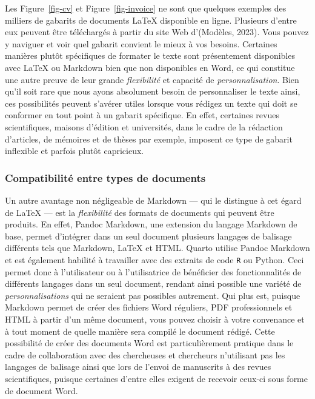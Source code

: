 \documentclass[
  letterpaper,
  DIV=11,
  numbers=noendperiod]{scrreprt}
\begin{document}
Les Figure~\ref{fig-cv} et Figure~\ref{fig-invoice} ne sont que quelques
exemples des milliers de gabarits de documents LaTeX disponible en
ligne. Plusieurs d'entre eux peuvent être téléchargés à partir du site
Web d'(Modèles, 2023). Vous pouvez y naviguer et voir quel gabarit
convient le mieux à vos besoins. Certaines manières plutôt spécifiques
de formater le texte sont présentement disponibles avec LaTeX ou
Markdown bien que non disponibles en Word, ce qui constitue une autre
preuve de leur grande \emph{flexibilité} et capacité de
\emph{personnalisation}. Bien qu'il soit rare que nous ayons absolument
besoin de personnaliser le texte ainsi, ces possibilités peuvent
s'avérer utiles lorsque vous rédigez un texte qui doit se conformer en
tout point à un gabarit spécifique. En effet, certaines revues
scientifiques, maisons d'édition et universités, dans le cadre de la
rédaction d'articles, de mémoires et de thèses par exemple, imposent ce
type de gabarit inflexible et parfois plutôt capricieux.

\subsubsection{Compatibilité entre types de
documents}\label{compatibilituxe9-entre-types-de-documents}

Un autre avantage non négligeable de Markdown --- qui le distingue à cet
égard de LaTeX --- est la \emph{flexibilité} des formats de documents
qui peuvent être produits. En effet, Pandoc Markdown, une extension du
langage Markdown de base, permet d'intégrer dans un seul document
plusieurs langages de balisage différents tels que Markdown, LaTeX et
HTML. Quarto utilise Pandoc Markdown et est également habilité à
travailler avec des extraits de code \texttt{R} ou Python. Ceci permet
donc à l'utilisateur ou à l'utilisatrice de bénéficier des
fonctionnalités de différents langages dans un seul document, rendant
ainsi possible une variété de \emph{personnalisations} qui ne seraient
pas possibles autrement. Qui plus est, puisque Markdown permet de créer
des fichiers Word réguliers, PDF professionnels et HTML à partir d'un
même document, vous pouvez choisir à votre convenance et à tout moment
de quelle manière sera compilé le document rédigé. Cette possibilité de
créer des documents Word est particulièrement pratique dans le cadre de
collaboration avec des chercheuses et chercheurs n'utilisant pas les
langages de balisage ainsi que lors de l'envoi de manuscrits à des
revues scientifiques, puisque certaines d'entre elles exigent de
recevoir ceux-ci sous forme de document Word.
\end{document}
